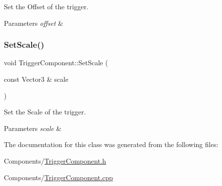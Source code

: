 Set the Offset of the trigger. 


\begin{DoxyParams}{Parameters}
{\em offset} & \\
\hline
\end{DoxyParams}
\mbox{\label{classTriggerComponent_add3b5a16e795c2cbd20600329cefd1b6}} 
\subsubsection{\texorpdfstring{Set\+Scale()}{SetScale()}}
{\footnotesize\ttfamily void Trigger\+Component\+::\+Set\+Scale (\begin{DoxyParamCaption}\item[{const Vector3 \&}]{scale }\end{DoxyParamCaption})}



Set the Scale of the trigger. 


\begin{DoxyParams}{Parameters}
{\em scale} & \\
\hline
\end{DoxyParams}


The documentation for this class was generated from the following files\+:\begin{DoxyCompactItemize}
\item 
Components/\hyperlink{TriggerComponent_8h}{Trigger\+Component.\+h}\item 
Components/\hyperlink{TriggerComponent_8cpp}{Trigger\+Component.\+cpp}\end{DoxyCompactItemize}
